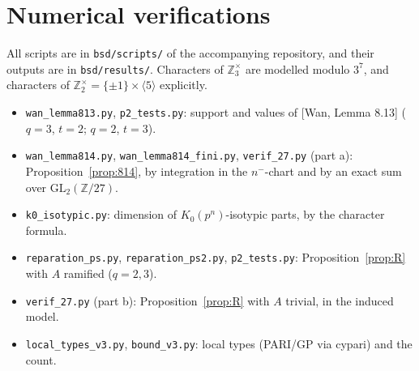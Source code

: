 \documentclass[11pt]{amsart}
\theoremstyle{definition}
\theoremstyle{remark}
\newcommand{\Z}{\mathbb{Z}}
\newcommand{\GL}{\mathrm{GL}}
\newcommand{\nm}{n^{-}}
\begin{document}
\appendix
\section{Numerical verifications}\label{app:num}
All scripts are in \texttt{bsd/scripts/} of the accompanying repository, and their outputs are in \texttt{bsd/results/}. Characters of $\Z_3^\times$ are modelled modulo $3^7$, and characters of $\Z_2^\times=\{\pm1\}\times\langle5\rangle$ explicitly.
\begin{itemize}
\item \texttt{wan\_lemma813.py}, \texttt{p2\_tests.py}: support and values of [Wan, Lemma 8.13] ($q=3$, $t=2$; $q=2$, $t=3$).
\item \texttt{wan\_lemma814.py}, \texttt{wan\_lemma814\_fini.py}, \texttt{verif\_27.py} (part a): Proposition~\ref{prop:814}, by integration in the $\nm$-chart and by an exact sum over $\GL_2(\Z/27)$.
\item \texttt{k0\_isotypic.py}: dimension of $K_0(p^n)$-isotypic parts, by the character formula.
\item \texttt{reparation\_ps.py}, \texttt{reparation\_ps2.py}, \texttt{p2\_tests.py}: Proposition~\ref{prop:R} with $A$ ramified ($q=2,3$).
\item \texttt{verif\_27.py} (part b): Proposition~\ref{prop:R} with $A$ trivial, in the induced model.
\item \texttt{local\_types\_v3.py}, \texttt{bound\_v3.py}: local types (PARI/GP via cypari) and the count.
\end{itemize}
\end{document}
